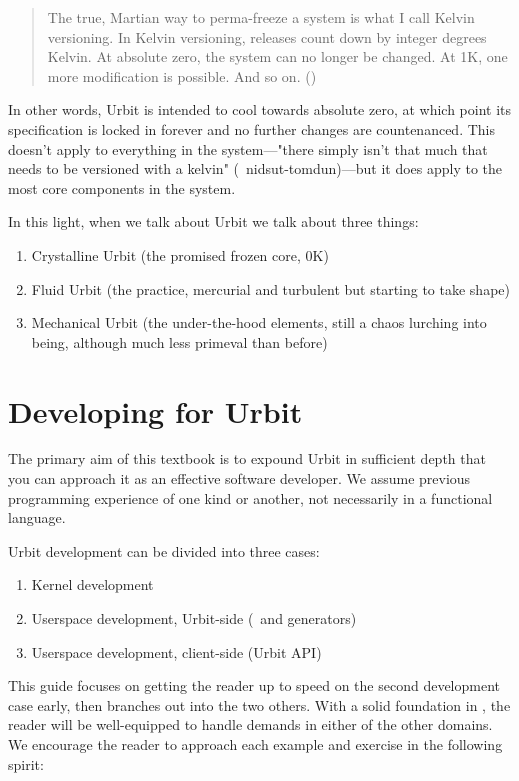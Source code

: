 {{{{\begin{quote}
The true, Martian way to perma-freeze a system is what I call Kelvin versioning.  In Kelvin versioning, releases count down by integer degrees Kelvin.  At absolute zero, the system can no longer be changed.  At 1K, one more modification is possible.  And so on.  (\cite{Yarvin2017})
\end{quote}

In other words, Urbit is intended to cool towards absolute zero, at which point its specification is locked in forever and no further changes are countenanced.  This doesn't apply to everything in the system—"there simply isn't that much that needs to be versioned with a kelvin" (~nidsut-tomdun)—but it does apply to the most core components in the system.

In this light, when we talk about Urbit we talk about three things:
\begin{enumerate}
	\item  Crystalline Urbit (the promised frozen core, 0K)
  \item  Fluid Urbit (the practice, mercurial and turbulent but starting to take shape)
  \item  Mechanical Urbit (the under-the-hood elements, still a chaos lurching into being, although much less primeval than before)
\end{enumerate}


\section{Developing for Urbit}

The primary aim of this textbook is to expound Urbit in sufficient depth that you can approach it as an effective software developer.  We assume previous programming experience of one kind or another, not necessarily in a functional language.

Urbit development can be divided into three cases:

\begin{enumerate}
	\item  Kernel development
	\item  Userspace development, Urbit-side (\gall~and generators)
	\item  Userspace development, client-side (Urbit API)
\end{enumerate}


This guide focuses on getting the reader up to speed on the second development case early, then branches out into the two others.  With a solid foundation in \gall, the reader will be well-equipped to handle demands in either of the other domains.  We encourage the reader to approach each example and exercise in the following spirit:

}}}}
